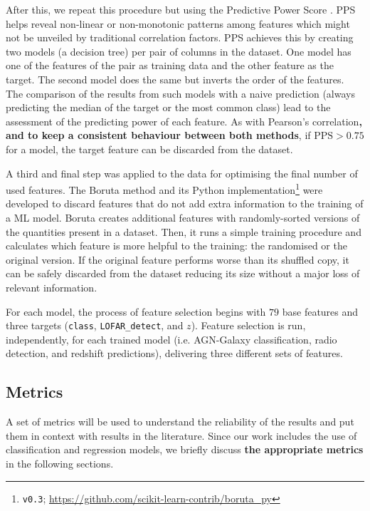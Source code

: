 \documentclass{aa}
\begin{document}
After this, we repeat this procedure but using the Predictive Power Score \citep[PPS, \texttt{v1.2.0};][]{PPSsoftware}. PPS helps reveal non-linear or non-monotonic patterns among features which might not be unveiled by traditional correlation factors. PPS achieves this by creating two models (a decision tree) per pair of columns in the dataset. One model has one of the features of the pair as training data and the other feature as the target. The second model does the same but inverts the order of the features. The comparison of the results from such models with a naive prediction (always predicting the median of the target or the most common class) lead to the assessment of the predicting power of each feature. As with Pearson's correlation\textbf{, and to keep a consistent behaviour between both methods}, if $\mathrm{PPS} > 0.75$ for a model, the target feature can be discarded from the dataset.

A third and final step was applied to the data for optimising the final number of used features. The Boruta method \citep{JSSv036i11} and its Python implementation\footnote{\texttt{v0.3}; \url{https://github.com/scikit-learn-contrib/boruta_py}} were developed to discard features that do not add extra information to the training of a ML model. Boruta creates additional features with randomly-sorted versions of the quantities present in a dataset. Then, it runs a simple training procedure and calculates which feature is more helpful to the training: the randomised or the original version. If the original feature performs worse than its shuffled copy, it can be safely discarded from the dataset reducing its size without a major loss of relevant information.

For each model, the process of feature selection begins with $79$ base features and three targets (\verb|class|, \verb|LOFAR_detect|, and $z$). Feature selection is run, independently, for each trained model (i.e. AGN-Galaxy classification, radio detection, and redshift predictions), delivering three different sets of features.

\subsection{Metrics}\label{sec:metrics}

A set of metrics will be used to understand the reliability of the results and put them in context with results in the literature. 
Since our work includes the use of classification and regression models, we briefly discuss \textbf{the appropriate metrics} in the following sections.
\end{document}
